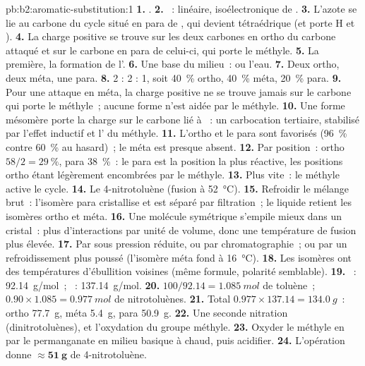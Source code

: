 \begin{solution}{pb:b2:aromatic-substitution:1}
\textbf{1.} .
\textbf{2.} ~: linéaire, isoélectronique de .
\textbf{3.} L'azote se lie au carbone du cycle situé en para de , qui devient tétraédrique
(et porte H et ).
\textbf{4.} La charge positive se trouve sur les deux carbones en ortho du carbone attaqué et sur le
carbone en para de celui-ci, qui porte le méthyle.
\textbf{5.} La première, la formation de l'.
\textbf{6.} Une base du milieu~:  ou l'eau.
\textbf{7.} Deux ortho, deux méta, une para.
\textbf{8.} 2 : 2 : 1, soit 40~\% ortho, 40~\% méta, 20~\% para.
\textbf{9.} Pour une attaque en méta, la charge positive ne se trouve jamais sur le carbone qui porte le méthyle~;
aucune forme n'est aidée par le méthyle.
\textbf{10.} Une forme mésomère porte la charge sur le carbone lié à ~: un carbocation
tertiaire, stabilisé par l'effet inductif et l' du méthyle.
\textbf{11.} L'ortho et le para sont favorisés (96~\% contre 60~\% au hasard)~; le méta est presque absent.
\textbf{12.} Par position~: ortho $58/2 = 29~\%$, para 38~\%~: le para est la position la plus réactive,
les positions ortho étant légèrement encombrées par le méthyle.
\textbf{13.} Plus vite~: le méthyle active le cycle.
\textbf{14.} Le 4-nitrotoluène (fusion à \qty{52}{\degreeCelsius}).
\textbf{15.} Refroidir le mélange brut~: l'isomère para cristallise et est séparé par filtration~; le
liquide retient les isomères ortho et méta.
\textbf{16.} Une molécule symétrique s'empile mieux dans un cristal~: plus d'interactions par unité de volume,
donc une température de fusion plus élevée.
\textbf{17.} Par  sous pression réduite, ou par chromatographie~; ou par
un refroidissement plus poussé (l'isomère méta fond à \qty{16}{\degreeCelsius}).
\textbf{18.} Les isomères ont des températures d'ébullition voisines (même formule, polarité semblable).
\textbf{19.} ~: \qty{92.14}{g/mol}~; ~: \qty{137.14}{g/mol}.
\textbf{20.} $100/92.14 = \qty{1.085}{mol}$ de toluène~; $0.90 \times 1.085 = \qty{0.977}{mol}$ de
nitrotoluènes.
\textbf{21.} Total $0.977 \times 137.14 = \qty{134.0}{g}$~: ortho \qty{77.7}{g}, méta
\qty{5.4}{g}, para \qty{50.9}{g}.
\textbf{22.} Une seconde nitration (dinitrotoluènes), et l'oxydation du groupe méthyle.
\textbf{23.} Oxyder le méthyle en  par le permanganate en milieu basique à chaud, puis acidifier.
\textbf{24.} L'opération donne $\boldsymbol{\approx \qty{51}{g}}$ de 4-nitrotoluène.
\end{solution}
